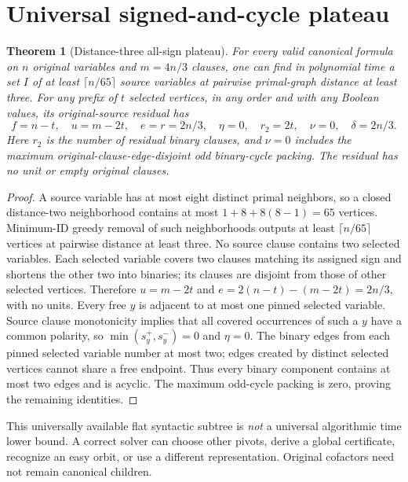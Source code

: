 \documentclass[11pt]{article}
\newtheorem{theorem}{Theorem}
\begin{document}
\section{Universal signed-and-cycle plateau}
\begin{theorem}[Distance-three all-sign plateau]
For \emph{every} valid canonical formula on $n$ original variables and $m=4n/3$ clauses, one can find in polynomial time a set $I$ of at least $\lceil n/65\rceil$ source variables at pairwise primal-graph distance at least three. For any prefix of $t$ selected vertices, in any order and with any Boolean values, its original-source residual has
\[
\boxed{f=n-t,\quad u=m-2t,\quad e=r=2n/3,\quad \eta=0,\quad r_2=2t,\quad\nu=0,\quad\delta=2n/3.}
\]
Here $r_2$ is the number of residual binary clauses, and $\nu=0$ includes the maximum original-clause-edge-disjoint odd binary-cycle packing. The residual has no unit or empty original clauses.
\end{theorem}
\begin{proof}
A source variable has at most eight distinct primal neighbors, so a closed distance-two neighborhood contains at most $1+8+8(8-1)=65$ vertices. Minimum-ID greedy removal of such neighborhoods outputs at least $\lceil n/65\rceil$ vertices at pairwise distance at least three. No source clause contains two selected variables. Each selected variable covers two clauses matching its assigned sign and shortens the other two into binaries; its clauses are disjoint from those of other selected vertices. Therefore $u=m-2t$ and $e=2(n-t)-(m-2t)=2n/3$, with no units. Every free $y$ is adjacent to at most one pinned selected variable. Source clause monotonicity implies that all covered occurrences of such a $y$ have a common polarity, so $\min(s_y^+,s_y^-)=0$ and $\eta=0$. The binary edges from each pinned selected variable number at most two; edges created by distinct selected vertices cannot share a free endpoint. Thus every binary component contains at most two edges and is acyclic. The maximum odd-cycle packing is zero, proving the remaining identities.
\end{proof}
This universally available flat syntactic subtree is \emph{not} a universal algorithmic time lower bound. A correct solver can choose other pivots, derive a global certificate, recognize an easy orbit, or use a different representation. Original cofactors need not remain canonical children.
\end{document}
